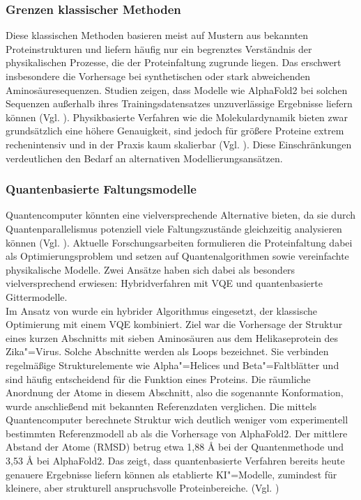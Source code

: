 \subsubsection*{Grenzen klassischer Methoden}
Diese klassischen Methoden basieren meist auf Mustern aus bekannten Proteinstrukturen und liefern häufig nur ein begrenztes Verständnis der physikalischen Prozesse, die der Proteinfaltung zugrunde liegen. Das erschwert insbesondere die Vorhersage bei synthetischen oder stark abweichenden Aminosäuresequenzen. Studien zeigen, dass Modelle wie AlphaFold2 bei solchen Sequenzen außerhalb ihres Trainingsdatensatzes unzuverlässige Ergebnisse liefern können (Vgl. \cite{outeiral2022}). Physikbasierte Verfahren wie die Molekulardynamik bieten zwar grundsätzlich eine höhere Genauigkeit, sind jedoch für größere Proteine extrem rechenintensiv und in der Praxis kaum skalierbar (Vgl. \cite{doga_perspective_2024}). Diese Einschränkungen verdeutlichen den Bedarf an alternativen Modellierungsansätzen.\\

\subsubsection*{Quantenbasierte Faltungsmodelle}
Quantencomputer könnten eine vielversprechende Alternative bieten, da sie durch Quantenparallelismus potenziell viele Faltungszustände gleichzeitig analysieren können (Vgl. \cite{doga_perspective_2024}). Aktuelle Forschungsarbeiten formulieren die Proteinfaltung dabei als Optimierungsproblem und setzen auf Quantenalgorithmen sowie vereinfachte physikalische Modelle. Zwei Ansätze haben sich dabei als besonders vielversprechend erwiesen: Hybridverfahren mit VQE und quantenbasierte Gittermodelle.\\

Im Ansatz von \citeauthor{doga_perspective_2024} wurde ein hybrider Algorithmus eingesetzt, der klassische Optimierung mit einem VQE kombiniert. Ziel war die Vorhersage der Struktur eines kurzen Abschnitts mit sieben Aminosäuren aus dem Helikaseprotein des Zika"=Virus. Solche Abschnitte werden als Loops bezeichnet. Sie verbinden regelmäßige Strukturelemente wie Alpha"=Helices und Beta"=Faltblätter und sind häufig entscheidend für die Funktion eines Proteins. Die räumliche Anordnung der Atome in diesem Abschnitt, also die sogenannte Konformation, wurde anschließend mit bekannten Referenzdaten verglichen. Die mittels Quantencomputer berechnete Struktur wich deutlich weniger vom experimentell bestimmten Referenzmodell ab als die Vorhersage von AlphaFold2. Der mittlere Abstand der Atome (RMSD) betrug etwa 1,88 Å bei der Quantenmethode und 3,53 Å bei AlphaFold2. Das zeigt, dass quantenbasierte Verfahren bereits heute genauere Ergebnisse liefern können als etablierte KI"=Modelle, zumindest für kleinere, aber strukturell anspruchsvolle Proteinbereiche. (Vgl. \cite{doga_perspective_2024})\\

